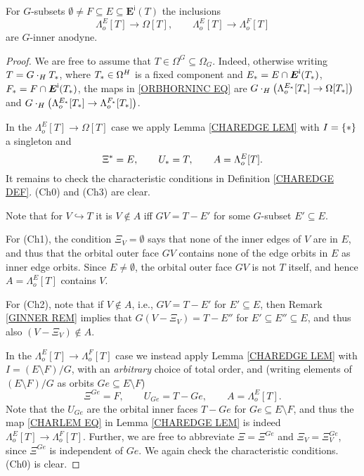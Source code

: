 \documentclass[a4paper,10pt
,draft
]{article}%
\begin{document}
\begin{proposition}\label{ORB_HORN_PROP}
	For $G$-subsets  
	$\emptyset \neq F \subseteq E \subseteq \boldsymbol{E}^{\mathsf{i}}(T)$
	the inclusions
\begin{equation}\label{ORBHORNINC EQ}
	\Lambda_o^{E}[T] \to \Omega[T],\qquad
	\Lambda_o^{E}[T] \to \Lambda_o^{F}[T]
\end{equation}
	are $G$-inner anodyne.
\end{proposition}

\begin{proof}
We are free to assume that $T \in \Omega^G \subseteq \Omega_G$. Indeed, otherwise writing $T = G \cdot_H T_{\**}$, where $T_{\**} \in \Omega^H$ is a fixed component and 
$E_{\**}=E \cap \boldsymbol{E}^{\mathsf{i}}(T_{\**})$, $F_{\**} = F \cap \boldsymbol{E}^{\mathsf{i}}(T_{\**})$,
the maps in \eqref{ORBHORNINC EQ} are
$G \cdot_H 
\left( \Lambda_o^{E_{\**}}[T_{\**}] \to \Omega[T_{\**}]\right)$
and
$G \cdot_H 
\left( \Lambda_o^{E_{\**}}[T_{\**}] \to \Lambda_o^{F_{\**}}[T_{\**}]\right)$.

In the $\Lambda_o^{E}[T] \to \Omega[T]$ case we apply
Lemma \ref{CHAREDGE LEM} with $I = \{\**\}$ a singleton and
\[
	\Xi^{\**} = E, \qquad 
	U_{\**} = T,\qquad
	A=\Lambda_o^{E}[T].
\]
It remains to check the characteristic conditions in Definition \ref{CHAREDGE DEF}.
(Ch0) and (Ch3) are clear.

Note that for $V\hookrightarrow T$ it is $V \not \in A$ iff 
$GV = T-E'$ for some $G$-subset
$E' \subseteq E$.

For (Ch1), the condition $\Xi_{V} = \emptyset$
says that none of the inner edges of $V$ are in $E$,
and thus that the orbital outer face $G V$ contains none of the edge orbits in $E$ as inner edge orbits. Since $E \neq \emptyset$, the orbital outer face $GV$ is not $T$ itself, 
and hence $A=\Lambda_o^{E}[T]$ contains $V$.

For (Ch2), note that if $V \not \in A$, i.e., 
$GV = T - E'$ for $E' \subseteq E$, then Remark \ref{GINNER REM} implies that
$G(V-\Xi_V) = T - E''$ for $E'\subseteq E'' \subseteq E$,
and thus also $(V-\Xi_V) \not \in A$.


In the $\Lambda_o^{E}[T] \to \Lambda_o^{F}[T]$ case 
we instead apply Lemma \ref{CHAREDGE LEM} with $I = (E \setminus F)/G$, with an 
\textit{arbitrary} choice of total order, and 
(writing elements of $(E \setminus F)/G$ as orbits $Ge \subseteq E \setminus F$)
\[
	\Xi^{Ge} = F, \qquad 
	U_{G e}= T - Ge, \qquad
	A=\Lambda_o^{E}[T].
\]
Note that the $U_{Ge}$ are the orbital inner faces $T - Ge$ for $Ge \subseteq E \setminus F$, and thus the map
\eqref{CHARLEM EQ}
in Lemma \ref{CHAREDGE LEM} is indeed $\Lambda_o^{E}[T] \to \Lambda_o^{F}[T]$.
Further, we are free to abbreviate $\Xi = \Xi^{Ge}$ and $\Xi_V = \Xi^{Ge}_V$, since
$\Xi^{Ge}$ is independent of $G e$.
We again check the characteristic conditions. (Ch0) is clear.


\end{proof}
\end{document}
